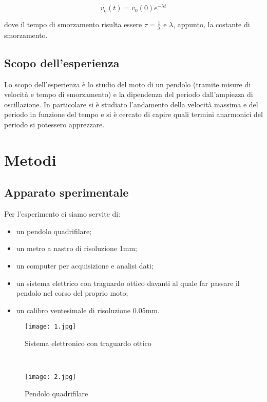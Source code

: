 \documentclass{article}
\begin{document}
\begin{equation}
    v_o(t) = v_0(0)e^{-\lambda t}
    \label{v}
\end{equation}

dove il tempo di smorzamento risulta essere $\tau = \frac{1}{\lambda}$ e $\lambda$, appunto, la costante di smorzamento.\\

\vspace{1em}

\subsection{Scopo dell'esperienza}
Lo scopo dell'esperienza è lo studio del moto di un pendolo (tramite misure di velocità e tempo di smorzamento) e la dipendenza del periodo dall'ampiezza di oscillazione. In particolare si
è studiato l’andamento della velocità massima e del periodo in funzione del tempo e si è cercato di capire quali
termini anarmonici del periodo si potessero apprezzare.


\vspace{2em}

\section{Metodi}
\subsection{Apparato sperimentale}
Per l'esperimento ci siamo servite di:
\begin{itemize}
    \item un pendolo quadrifilare;
    \item un metro a nastro di risoluzione 1mm;
    \item un computer per acquisizione e analisi dati;
    \item un sistema elettrico con traguardo ottico davanti al quale far passare il pendolo nel corso del proprio moto;
    \item un calibro ventesimale di risoluzione 0.05mm.
\end{itemize}

\begin{figure} [H]
\begin{minipage}[b]{8.5cm}
\centering
\texttt{[image: 1.jpg]}
\caption{Sistema elettronico con traguardo ottico}
\end{minipage}
\ \hspace{2mm} \hspace{3mm} \
\begin{minipage}[b]{8.5cm}
\centering
\texttt{[image: 2.jpg]}
\caption{Pendolo quadrifilare\\}
\end{minipage}
\end{figure}
\end{document}
